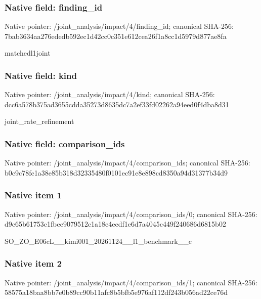 \documentclass[10pt,a4paper]{article}
\begin{document}
\subsubsection{Native field: finding\_id}


Native pointer: /joint\_analysis/impact/4/finding\_id; canonical SHA-256: 7bab3634aa276ededb592ec1\allowbreak{}d42cc0c351e612cea26f1a8c\allowbreak{}c1d5979d877ae8fa


matchedl1joint


\subsubsection{Native field: kind}


Native pointer: /joint\_analysis/impact/4/kind; canonical SHA-256: dcc6a578b375ad3655cdda35\allowbreak{}273d8635dc7a2ef33fd02262\allowbreak{}a94eed0f4dba8d31


joint\_rate\_refinement


\subsubsection{Native field: comparison\_ids}


Native pointer: /joint\_analysis/impact/4/comparison\_ids; canonical SHA-256: b0c9c78fc1a38e85b318d323\allowbreak{}35480f0101ec91e8e898cd83\allowbreak{}50a94d31377b34d9



\subsubsection{Native item 1}


Native pointer: /joint\_analysis/impact/4\allowbreak{}/comparison\_ids/0; canonical SHA-256: d9c65b61753c1fbee9079512\allowbreak{}c1a18e4ecdf1e6d7a4045c44\allowbreak{}9f240686d6815b02


SO\_ZO\_E06cL\_\_kimi001\_202\allowbreak{}61124\_\_l1\_benchmark\_\_c


\subsubsection{Native item 2}


Native pointer: /joint\_analysis/impact/4\allowbreak{}/comparison\_ids/1; canonical SHA-256: 58575a18baa8bb7e0b89cc90\allowbreak{}b11afc8b5bfb5e976af112df\allowbreak{}243b056ad22ce76d
\end{document}
